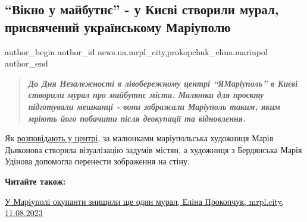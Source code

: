  
 
 
 
 
 
\subsection{\enquote{Вікно у майбутнє} - у Києві створили мурал, присвячений українському Маріуполю}
\label{sec:29_08_2023.stz.news.ua.mrpl_city.1.vikno_u_majbutnje_mural_kyiv_mariupol}
 
\ifcmt
 author_begin
   author_id news.ua.mrpl_city,prokopchuk_elina.mariupol
 author_end
\fi

\begin{quote}
\em\color{blue}
\textbf{До Дня Незалежності в лівобережному центрі \enquote{ЯМаріуполь} в Києві створили мурал
про майбутнє міста. Малюнки для проєкту підготували мешканці - вони зображали
Маріуполь таким, яким мріють його побачити після деокупації та відновлення.}
\end{quote}


Як \href{https://t.me/yamariupol_kyiv/8546}{розповідають у центрі}, за малюнками маріупольська художниця Марія Дьяконова
створила візуалізацію задумів містян, а художниця з Бердянська Марія Удінова
допомогла перенести зображення на стіну.


\vspace{0.5cm}
\begin{minipage}{0.9\textwidth}
	
\textbf{Читайте також:} 

\href{https://mrpl.city/news/view/u-mariupoli-okupanti-znishhili-shhe-odin-mural}{%
У Маріуполі окупанти знищили ще один мурал, Еліна Прокопчук, mrpl.city, 11.08.2023}
\end{minipage}
\vspace{0.5cm}

